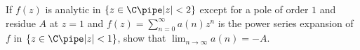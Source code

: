If $f(z)$ is analytic in $\{z\in \C \pipe |z|<2\}$ except for a pole
of order $1$ and residue $A$ at $z=1$ and $f(z)=\sum_{n=0}^{\infty
}a(n)z^n$ is the power series expansion of $f$ in $\{z\in \C\pipe 
|z|<1\}$, show that $\lim_{n\rightarrow \infty}a(n)=-A$.